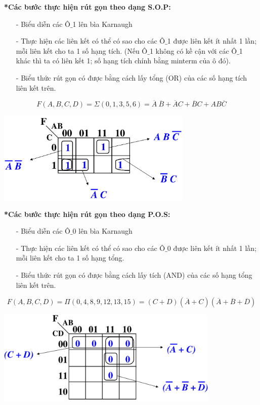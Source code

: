 \textbf{*Các bước thực hiện rút gọn theo dạng S.O.P:}
\begin{itemize}
    \item[-] Biểu diễn các Ô$\_$1 lên bìa Karnaugh
    \item[-] Thực hiện các liên kết có thể có sao cho các Ô$\_$1 được liên kết ít nhất 1 lần; mỗi liên kết cho ta 1 số hạng tích. (Nếu Ô$\_$1 không có kề cận với các Ô$\_$1 khác thì ta có liên kết 1; số hạng tích chính bằng minterm của ô đó).
    \item[-] Biểu thức rút gọn có được bằng cách lấy tổng (OR) của các số hạng tích liên kết trên.
\end{itemize}
\[
    F(A,B,C,D) = \varSigma (0,1,3,5,6) = \overline{A}\ \overline{B} + \overline{A}C + \overline{B}C + AB\overline{C}
\]
\begin{center}
    \includegraphics[width = 0.7\textwidth]{./local/image/35.png}
\end{center}
\textbf{*Các bước thực hiện rút gọn theo dạng P.O.S:}
\begin{itemize}
    \item[-] Biểu diễn các Ô$\_$0 lên bìa Karnaugh
    \item[-] Thực hiện các liên kết có thể có sao cho các Ô$\_$0 được liên kết ít nhất 1 lần; mỗi liên kết cho ta 1 số hạng tổng.
    \item[-] Biểu thức rút gọn có được bằng cách lấy tích (AND) của các số hạng tổng liên kết trên.
\end{itemize}
\[
    F(A,B,C,D) = \varPi(0,4,8,9,12,13,15) = (C+D)(\overline{A} + C)(\overline{A} + \overline{B} + \overline{D})
\]
\begin{center}
    \includegraphics[width = 0.8\textwidth]{./local/image/36.png}
\end{center}
